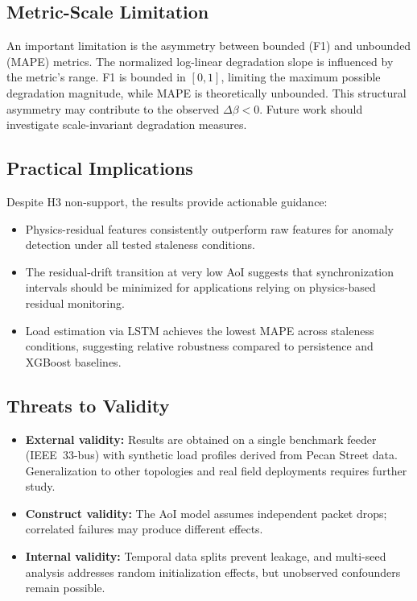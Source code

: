 \documentclass[journal]{IEEEtran}
\newcommand{\dbeta}{\Delta\beta}
\begin{document}
\subsection{Metric-Scale Limitation}
An important limitation is the asymmetry between bounded (F1) and unbounded
(MAPE) metrics. The normalized log-linear degradation slope is influenced
by the metric's range. F1 is bounded in $[0,1]$, limiting the maximum
possible degradation magnitude, while MAPE is theoretically unbounded.
This structural asymmetry may contribute to the observed $\dbeta < 0$.
Future work should investigate scale-invariant degradation measures.

\subsection{Practical Implications}
Despite H3 non-support, the results provide actionable guidance:
\begin{itemize}
    \item Physics-residual features consistently outperform raw features
          for anomaly detection under all tested staleness conditions.
    \item The residual-drift transition at very low AoI suggests that
          synchronization intervals should be minimized for applications
          relying on physics-based residual monitoring.
    \item Load estimation via LSTM achieves the lowest MAPE across
          staleness conditions, suggesting relative robustness compared
          to persistence and XGBoost baselines.
\end{itemize}

\subsection{Threats to Validity}
\begin{itemize}
    \item \textbf{External validity:} Results are obtained on a single
          benchmark feeder (IEEE~33-bus) with synthetic load profiles
          derived from Pecan Street data. Generalization to other
          topologies and real field deployments requires further study.
    \item \textbf{Construct validity:} The AoI model assumes independent
          packet drops; correlated failures may produce different effects.
    \item \textbf{Internal validity:} Temporal data splits prevent leakage,
          and multi-seed analysis addresses random initialization effects,
          but unobserved confounders remain possible.
\end{itemize}
\end{document}
